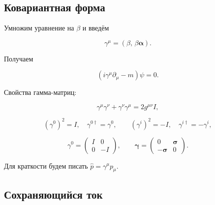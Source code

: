 \documentclass[../final.tex]{subfiles}
\begin{document}
\subsection{Ковариантная форма}

Умножим уравнение на $\beta$ и введём 

\begin{equation*}
    \gamma^\mu=\left(\beta,\,\beta\boldsymbol\alpha\right).
\end{equation*}

Получаем 

\begin{equation*}
    \left(i\gamma^\mu\partial_\mu-m\right)\psi=0.
\end{equation*}

Свойства гамма-матриц:

\begin{equation*}
    \gamma^\mu\gamma^\nu+\gamma^\nu\gamma^\mu=2g^{\mu\nu}I,
\end{equation*}

\begin{equation*}
    \left(\gamma^0\right)^2=I,
    \quad
    \gamma^{0\dagger}=\gamma^0,
    \qquad
    \left(\gamma^i\right)^2=-I,
    \quad
    \gamma^{i\dagger}=-\gamma^i,
\end{equation*}

\begin{equation*}
    \gamma^0
    =
    \begin{pmatrix}
        I & 0\\
        0 & -I
    \end{pmatrix},
    \qquad
    \boldsymbol\gamma
    =
    \begin{pmatrix}
        0 & \boldsymbol\sigma\\
        -\boldsymbol\sigma & 0
    \end{pmatrix}.
\end{equation*}

Для краткости будем писать $\hat p=\gamma^\mu p_\mu$.


\subsection{Сохраняющийся ток}
\end{document}
